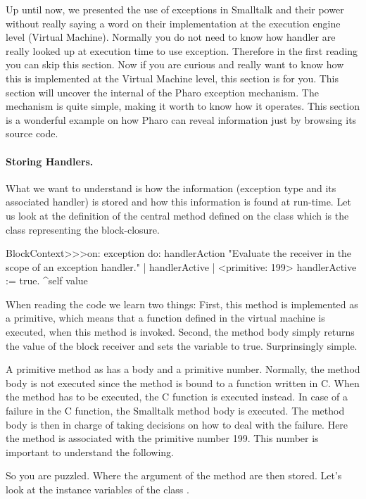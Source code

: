 \documentclass[a4paper,10pt,twoside]{book}
\begin{document}
Up until now, we presented the use of exceptions in Smalltalk and their power without really saying a word on their implementation
at the execution engine level (Virtual Machine). Normally you do not need to know how handler are really looked up at execution time to use exception. Therefore in the first reading you can skip this section. Now if you are curious and really want to know how this is implemented 
at the Virtual Machine level, this section is for you.  This section will uncover the internal of the Pharo exception mechanism. The mechanism is quite simple, making it worth to know how it operates. This section is a wonderful example on how Pharo can reveal information just by browsing its source code.

\paragraph{Storing Handlers.}
What we want to understand is how the information (exception type and its associated handler) is stored and how this information is found at run-time. Let us look at the definition of the central method  defined on the class  which is the class representing the block-closure. 

\begin{code}{}
BlockContext>>>on: exception do: handlerAction 
	"Evaluate the receiver in the scope of an exception handler." 
	| handlerActive | 
	<primitive: 199> 
	handlerActive := true. 
	^self value 
\end{code}

When reading the code we learn two things: First, this method is implemented as a primitive, which means that  a function defined in the virtual machine is executed, when this method is invoked. Second, the method body simply returns the value of the block receiver and sets the variable  to true. Surprinsingly simple. 

A primitive method as  has a body and a primitive number. Normally, the method body is not executed since the method is bound to a function written in C. When the method has to be executed, the C function is executed instead. In case of a failure in the C function, the Smalltalk method body is executed. The method body is then in charge of taking decisions on how to deal with the failure.
Here the method  is associated with the primitive number 199. This number is important to understand the following. 

So you are puzzled. Where the argument of the  method are then stored. Let's look at the instance variables of the class . 
\end{document}
